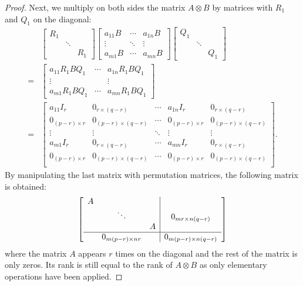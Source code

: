 \documentclass[11pt]{article}
\newcommand{\kp}{\otimes} %
\begin{document}
\begin{proof}
Next, we multiply on both sides the matrix $A\kp B$ by matrices with $R_1$ and $Q_1$ on the diagonal:
\begin{align*}
    &\begin{bmatrix}
    R_1 & &\\
    & \ddots & \\
    & & R_1
    \end{bmatrix}
    \begin{bmatrix}
    a_{11}B & \cdots & a_{1n}B\\
    \vdots & \ddots & \vdots\\
    a_{m1}B & \cdots & a_{mn}B
    \end{bmatrix}
    \begin{bmatrix}
    Q_1 & &\\
    & \ddots & \\
    & & Q_1
    \end{bmatrix}\\
    = &\begin{bmatrix}
    a_{11}R_1BQ_1 & \cdots & a_{1n}R_1BQ_1\\
    \vdots & & \vdots\\
    a_{m1}R_1BQ_1 & \cdots & a_{mn}R_1BQ_1
    \end{bmatrix}\\
    = &\begin{bmatrix}
    a_{11}I_r & 0_{r \times (q - r)} & \cdots & a_{1n}I_r & 0_{r \times (q-r)}\\
    0_{(p-r) \times r} & 0_{(p-r) \times (q-r)} & \cdots & 0_{(p-r) \times r} & 0_{(p-r) \times (q-r)}\\
    \vdots & \vdots & \ddots & \vdots & \vdots\\
    a_{m1}I_r & 0_{r \times (q - r)} & \cdots & a_{mn}I_r & 0_{r \times (q - r)}\\
    0_{(p-r) \times r} & 0_{(p-r) \times (q-r)}& \cdots & 0_{(p-r) \times r} & 0_{(p-r) \times (q-r)}\\
    \end{bmatrix}.
\end{align*}
By manipulating the last matrix with permutation matrices, the following matrix is obtained:
\[
    \mleft[\begin{array}{c c c|c}
    A & & & \\
    & \ddots &  &0_{mr \times n(q-r)} \\
    & & A & \\\hline
    & 0_{m(p-r) \times nr} & & 0_{m(p-r) \times n(q-r)} \\
    \end{array} \mright]
\]
where the matrix \(A\) appears \(r\) times on the diagonal and the rest of the matrix is only zeros. 
Its rank is still equal to the rank of $A\kp B$ as only elementary operations have been applied.


\end{proof}
\end{document}
